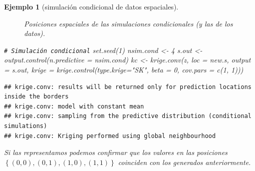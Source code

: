 \documentclass[
]{book}
\newenvironment{Shaded}{\begin{snugshade}}{\end{snugshade}}
\newcommand{\AttributeTok}[1]{\textcolor[rgb]{0.77,0.63,0.00}{#1}}
\newcommand{\CommentTok}[1]{\textcolor[rgb]{0.56,0.35,0.01}{\textit{#1}}}
\newcommand{\DecValTok}[1]{\textcolor[rgb]{0.00,0.00,0.81}{#1}}
\newcommand{\FunctionTok}[1]{\textcolor[rgb]{0.00,0.00,0.00}{#1}}
\newcommand{\NormalTok}[1]{#1}
\newcommand{\OtherTok}[1]{\textcolor[rgb]{0.56,0.35,0.01}{#1}}
\newcommand{\StringTok}[1]{\textcolor[rgb]{0.31,0.60,0.02}{#1}}
\theoremstyle{break}
\newtheorem{example}{Ejemplo}[chapter]
\theoremstyle{nonumberplain}
\renewcommand{\CommentTok}[1]{\textcolor[rgb]{0.41,0.41,0.41}{\texttt{#1}}}
\begin{document}
\begin{example}[simulación condicional de datos espaciales]
\begin{figure}[!htb]
{}

\caption{Posiciones espaciales de las simulaciones condicionales (y las de los datos).}\label{fig:pos-sp-simcond}
\end{figure}

\begin{Shaded}
\begin{Highlighting}[]
\CommentTok{\# Simulación condicional}
\FunctionTok{set.seed}\NormalTok{(}\DecValTok{1}\NormalTok{)}
\NormalTok{nsim.cond }\OtherTok{\textless{}{-}} \DecValTok{4}
\NormalTok{s.out }\OtherTok{\textless{}{-}} \FunctionTok{output.control}\NormalTok{(}\AttributeTok{n.predictive =}\NormalTok{ nsim.cond)}
\NormalTok{kc }\OtherTok{\textless{}{-}} \FunctionTok{krige.conv}\NormalTok{(z, }\AttributeTok{loc =}\NormalTok{ new.s, }\AttributeTok{output =}\NormalTok{ s.out,}
                 \AttributeTok{krige =} \FunctionTok{krige.control}\NormalTok{(}\AttributeTok{type.krige=}\StringTok{"SK"}\NormalTok{, }\AttributeTok{beta =} \DecValTok{0}\NormalTok{, }\AttributeTok{cov.pars =} \FunctionTok{c}\NormalTok{(}\DecValTok{1}\NormalTok{, }\DecValTok{1}\NormalTok{)))}
\end{Highlighting}
\end{Shaded}

\begin{verbatim}
## krige.conv: results will be returned only for prediction locations inside the borders
## krige.conv: model with constant mean
## krige.conv: sampling from the predictive distribution (conditional simulations)
## krige.conv: Kriging performed using global neighbourhood
\end{verbatim}

Si las representamos podemos confirmar que los valores en las posiciones \(\left\{(0,0),(0,1),(1,0),(1,1)\right\}\) coinciden con los generados anteriormente.


\end{example}
\end{document}
